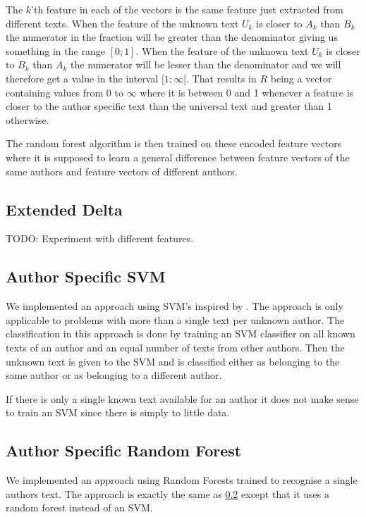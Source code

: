 The $k$'th feature in each of the vectors is the same feature just extracted
from different texts. When the feature of the unknown text $U_k$ is closer to
$A_k$ than $B_k$ the numerator in the fraction will be greater than the
denominator giving us something in the range $[0; 1]$. When the feature of the
unknown text $U_k$ is closer to $B_k$ than $A_k$ the numerator will be lesser
than the denominator and we will therefore get a value in the interval
$[1; \infty[$. That results in $R$ being a vector containing values from 0 to
$\infty$ where it is between 0 and 1 whenever a feature is closer to the author
specific text than the universal text and greater than 1 otherwise.

The random forest algorithm is then trained on these encoded feature vectors
where it is supposed to learn a general difference between feature vectors of
the same authors and feature vectors of different authors.

\subsection{Extended Delta}
TODO: Experiment with different features.

\subsection{Author Specific SVM} \label{subsec:author_specific_svm}
We implemented an approach using \gls{SVM}'s inspired by \cite{hansen2014}. The
approach is only applicable to problems with more than a single text per
unknown author. The classification in this approach is done by training an \gls{SVM}
classifier on all known texts of an author and an equal number of texts from
other authors. Then the unknown text is given to the \gls{SVM} and is classified
either as belonging to the same author or as belonging to a different author.

If there is only a single known text available for an author it does not make
sense to train an \gls{SVM} since there is simply to little data.

\subsection{Author Specific Random Forest}
We implemented an approach using Random Forests trained to recognise a single
authors text. The approach is exactly the same as
\ref{subsec:author_specific_svm} except that it uses a random forest instead of
an \gls{SVM}.

